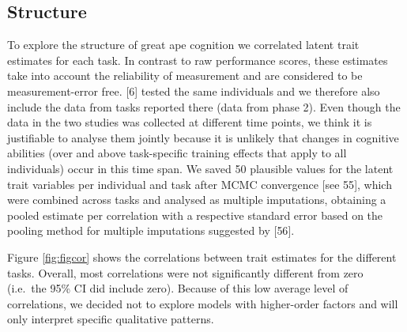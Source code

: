 \documentclass[
  man,floatsintext]{apa6}
\begin{document}
\subsection{Structure}\label{structure}

To explore the structure of great ape cognition we correlated latent trait estimates for each task. In contrast to raw performance scores, these estimates take into account the reliability of measurement and are considered to be measurement-error free. {[}6{]} tested the same individuals and we therefore also include the data from tasks reported there (data from phase 2). Even though the data in the two studies was collected at different time points, we think it is justifiable to analyse them jointly because it is unlikely that changes in cognitive abilities (over and above task-specific training effects that apply to all individuals) occur in this time span. We saved 50 plausible values for the latent trait variables per individual and task after MCMC convergence {[}see 55{]}, which were combined across tasks and analysed as multiple imputations, obtaining a pooled estimate per correlation with a respective standard error based on the pooling method for multiple imputations suggested by {[}56{]}.

Figure \ref{fig:figcor} shows the correlations between trait estimates for the different tasks. Overall, most correlations were not significantly different from zero (i.e.~the 95\% CI did include zero). Because of this low average level of correlations, we decided not to explore models with higher-order factors and will only interpret specific qualitative patterns.
\end{document}
